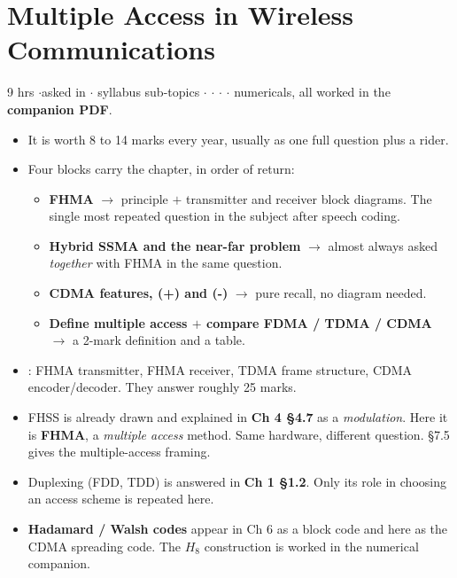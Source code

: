 \section{Multiple Access in Wireless Communications}

{\color{sub}\footnotesize 9 hrs \gap$\cdot$\gap asked in 
\gap$\cdot$ syllabus sub-topics \gap$\cdot$\gap {} \gap$\cdot$\gap {} \gap$\cdot$\gap
{} \gap$\cdot$ numericals, all worked in the \textbf{companion PDF}.}

\begin{itemize}
  \item {} It is worth 8 to 14 marks every year,
        usually as one full question plus a rider.
  \item Four blocks carry the chapter, in order of return:
  \begin{itemize}
    \item \textbf{FHMA}  $\rightarrow$ principle $+$ transmitter and receiver block
          diagrams. The single most repeated question in the subject after speech coding.
    \item \textbf{Hybrid SSMA and the near-far problem}  $\rightarrow$ almost always
          asked \emph{together} with FHMA in the same question.
    \item \textbf{CDMA features, (+) and (-)}  $\rightarrow$ pure recall, no diagram
          needed.
    \item \textbf{Define multiple access $+$ compare FDMA / TDMA / CDMA} 
          $\rightarrow$ a 2-mark definition and a table.
  \end{itemize}
  \item {}: FHMA transmitter, FHMA receiver, TDMA frame structure,
        CDMA encoder/decoder. They answer roughly 25 marks.
  \item FHSS is already drawn and explained in \textbf{Ch 4 \S4.7} as a \emph{modulation}.
        Here it is \textbf{FHMA}, a \emph{multiple access} method. Same hardware, different
        question. \S7.5 gives the multiple-access framing.
  \item Duplexing (FDD, TDD) is answered in \textbf{Ch 1 \S1.2}. Only its role in choosing an
        access scheme is repeated here.
  \item \textbf{Hadamard / Walsh codes} appear in Ch 6 as a block code and here as the CDMA
        spreading code. The $H_8$ construction is worked in the numerical companion.
\end{itemize}

